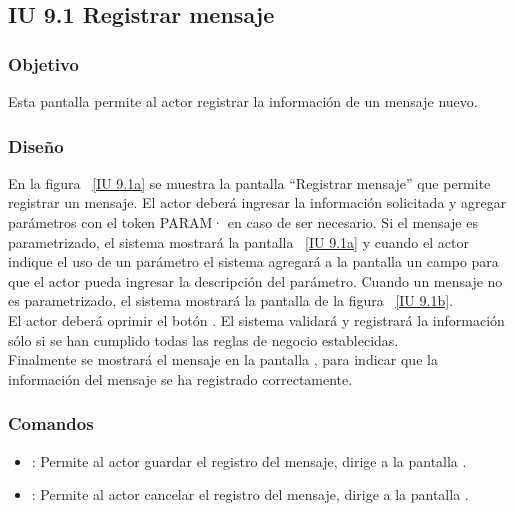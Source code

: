 \subsection{IU 9.1 Registrar mensaje}

\subsubsection{Objetivo}
	
	Esta pantalla permite al actor registrar la información de un mensaje nuevo.

\subsubsection{Diseño}

    En la figura ~\ref{IU 9.1a} se muestra la pantalla ``Registrar mensaje'' que permite registrar un mensaje. El actor deberá ingresar la información solicitada 
    y agregar parámetros con el token PARAM· en caso de ser necesario. Si el mensaje es parametrizado, el sistema mostrará la pantalla ~\ref{IU 9.1a} y 
    cuando el actor indique el uso de un parámetro el sistema agregará a la pantalla un campo para que el actor pueda ingresar la descripción del parámetro. 
    Cuando un mensaje no es parametrizado, el sistema mostrará la pantalla de la figura ~\ref{IU 9.1b}.\\
    
    El actor deberá oprimir el botón . El sistema validará y registrará la información sólo si se han cumplido todas las reglas de negocio establecidas.  \\
    
    Finalmente se mostrará el mensaje  en la pantalla , para indicar que la información del mensaje
    se ha registrado correctamente.        


\subsubsection{Comandos}
\begin{itemize}
	\item {}: Permite al actor guardar el registro del mensaje, dirige a la pantalla .
	\item {}: Permite al actor cancelar el registro del mensaje, dirige a la pantalla .
\end{itemize}

